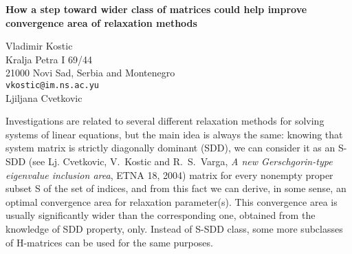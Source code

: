 \documentclass{report}
\begin{document}

\begin{center}
{\large
{\bf How a step toward wider class of matrices could help improve \\
	convergence area of relaxation methods}}

	Vladimir Kostic \\
	Kralja Petra I 69/44 \\
	21000 Novi Sad, Serbia and Montenegro \\
	{\tt vkostic@im.ns.ac.yu} \\
	Ljiljana Cvetkovic
\end{center}
Investigations are related to several different relaxation
methods for solving systems of linear equations, but the
main idea is always the same: knowing that system matrix is
strictly diagonally dominant (SDD), we can consider it as an
S-SDD (see Lj. Cvetkovic, V.~Kostic and R.~S.~Varga,
{\em A new Gerschgorin-type eigenvalue inclusion area},
ETNA 18, 2004)
matrix for every nonempty proper subset S of the set
of indices, and from this fact we can derive, in some sense,
an optimal convergence area for relaxation parameter(s).
This convergence area is usually significantly wider than
the corresponding one, obtained from the knowledge of SDD
property, only. Instead of S-SDD class, some more subclasses
of H-matrices can be used for the same purposes.



\end{document}
